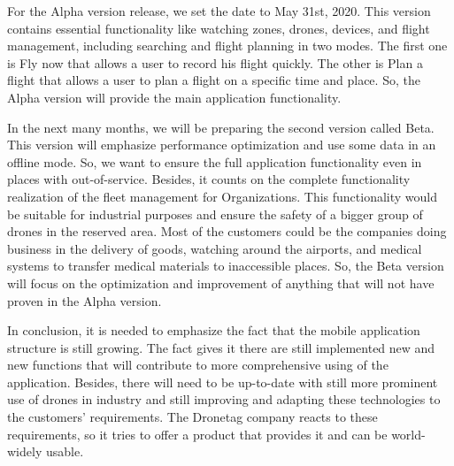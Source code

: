 For the Alpha version release, we set the date to May 31st, 2020.
This version contains essential functionality like watching zones, drones, devices, and flight management, including searching and flight planning in two modes.
The first one is Fly now that allows a user to record his flight quickly.
The other is Plan a flight that allows a user to plan a flight on a specific time and place.
So, the Alpha version will provide the main application functionality.

In the next many months, we will be preparing the second version called Beta.
This version will emphasize performance optimization and use some data in an offline mode.
So, we want to ensure the full application functionality even in places with out-of-service.
Besides, it counts on the complete functionality realization of the fleet management for Organizations.
This functionality would be suitable for industrial purposes and ensure the safety of a bigger group of drones in the reserved area.
Most of the customers could be the companies doing business in the delivery of goods, watching around the airports, and medical systems to transfer medical materials to inaccessible places.
So, the Beta version will focus on the optimization and improvement of anything that will not have proven in the Alpha version.

In conclusion, it is needed to emphasize the fact that the mobile application structure is still growing.
The fact gives it there are still implemented new and new functions that will contribute to more comprehensive using of the application.
Besides, there will need to be up-to-date with still more prominent use of drones in industry and still improving and adapting these technologies to the customers’ requirements.
The Dronetag company reacts to these requirements, so it tries to offer a product that provides it and can be world-widely usable.
